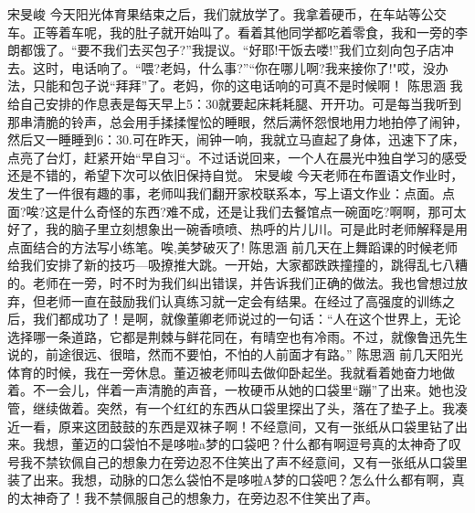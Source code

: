 {}宋旻峻\markdownRendererInterblockSeparator
{}今天阳光体育果结束之后，我们就放学了。我拿着硬币，在车站等公交车。正等着车呢，我的肚子就开始叫了。看着其他同学都吃着零食，我和一旁的李朗都饿了。“要不我们去买包子?”我提议。“好耶!干饭去喽!”我们立刻向包子店冲去。这时，电话响了。“喂?老妈，什么事?”“你在哪儿啊?我来接你了!"哎，没办法，只能和包子说“拜拜”了。老妈，你的这电话响的可真不是时候啊！\markdownRendererInterblockSeparator
{}\markdownRendererInterblockSeparator
{}陈思涵\markdownRendererInterblockSeparator
{}我给自己安排的作息表是每天早上5：30就要起床耗耗腿、开开功。可是每当我听到那串清脆的铃声，总会用手揉揉惺忪的睡眼，然后满怀怨恨地用力地拍停了闹钟，然后又一睡睡到6：30.可在昨天，闹钟一响，我就立马直起了身体，迅速下了床，点亮了台灯，赶紧开始“早自习“。不过话说回来，一个人在晨光中独自学习的感受还是不错的，希望下次可以依旧保持自觉。\markdownRendererInterblockSeparator
{}\markdownRendererInterblockSeparator
{}宋旻峻\markdownRendererInterblockSeparator
{}今天老师在布置语文作业时，发生了一件很有趣的事，老师叫我们翻开家校联系本，写上语文作业：点面。点面?唉?这是什么奇怪的东西?难不成，还是让我们去餐馆点一碗面吃?啊啊，那可太好了，我的脑子里立刻想象出一碗香喷喷、热呼的片儿川。可是此时老师解释是用点面结合的方法写小练笔。唉,美梦破灭了!\markdownRendererInterblockSeparator
{}\markdownRendererInterblockSeparator
{}陈思涵\markdownRendererInterblockSeparator
{}前几天在上舞蹈课的时候老师给我们安排了新的技巧—吸撩推大跳。一开始，大家都跌跌撞撞的，跳得乱七八糟的。老师在一旁，时不时为我们纠出错误，并告诉我们正确的做法。我也曾想过放弃，但老师一直在鼓励我们认真练习就一定会有结果。在经过了高强度的训练之后，我们都成功了！是啊，就像董卿老师说过的一句话：“人在这个世界上，无论选择哪一条道路，它都是荆棘与鲜花同在，有晴空也有冷雨。不过，就像鲁迅先生说的，前途很远、很暗，然而不要怕，不怕的人前面才有路。”\markdownRendererInterblockSeparator
{}\markdownRendererInterblockSeparator
{}陈思涵\markdownRendererInterblockSeparator
{}前几天阳光体育的时候，我在一旁休息。董迈被老师叫去做仰卧起坐。我就看着她奋力地做着。不一会儿，伴着一声清脆的声音，一枚硬币从她的口袋里“蹦”了出来。她也没管，继续做着。突然，有一个红红的东西从口袋里探出了头，落在了垫子上。我凑近一看，原来这团鼓鼓的东西是双袜子啊！不经意间，又有一张纸从口袋里钻了出来。我想，董迈的口袋怕不是哆啦a梦的口袋吧？什么都有啊逗号真的太神奇了叹号我不禁钦佩自己的想象力在旁边忍不住笑出了声不经意间，又有一张纸从口袋里装了出来。我想，动脉的口怎么袋怕不是哆啦A梦的口袋吧？怎么什么都有啊，真的太神奇了！我不禁佩服自己的想象力，在旁边忍不住笑出了声。\markdownRendererInterblockSeparator
